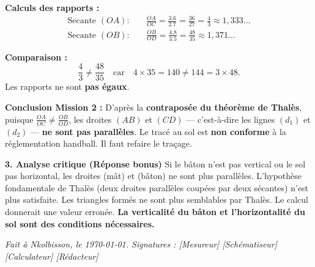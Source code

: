\documentclass[11pt]{article}
\begin{document}
\begin{exoresolu}
\noindent\textbf{Calculs des rapports :}
\begin{align*}
\text{Secante } (OA) : \quad & \frac{OA}{OC} = \frac{\num{3,6}}{\num{2,7}} = \frac{36}{27} = \frac{4}{3} \approx 1,333\ldots \\[4pt]
\text{Secante } (OB) : \quad & \frac{OB}{OD} = \frac{\num{4,8}}{\num{3,5}} = \frac{48}{35} \approx 1,371\ldots
\end{align*}

\noindent\textbf{Comparaison :}
\[
\frac{4}{3} \neq \frac{48}{35} \quad \text{car} \quad 4 \times 35 = 140 \neq 144 = 3 \times 48.
\]
Les rapports ne sont \textbf{pas égaux}.

\noindent\textbf{Conclusion Mission 2 :} D'après la \textbf{contraposée du théorème de Thalès}, puisque $\frac{OA}{OC} \neq \frac{OB}{OD}$, les droites $(AB)$ et $(CD)$ — c'est-à-dire les lignes $(d_1)$ et $(d_2)$ — \textbf{ne sont pas parallèles}.
Le tracé au sol est \textbf{non conforme} à la réglementation handball. Il faut refaire le traçage.

\vspace{0,3cm}
\noindent\textbf{3. Analyse critique (Réponse bonus)}
Si le bâton n'est pas vertical ou le sol pas horizontal, les droites (mât) et (bâton) ne sont plus parallèles. L'hypothèse fondamentale de Thalès (deux droites parallèles coupées par deux sécantes) n'est plus satisfaite. Les triangles formés ne sont plus semblables par Thalès. Le calcul donnerait une valeur erronée. \textbf{La verticalité du bâton et l'horizontalité du sol sont des conditions nécessaires.}

\vspace{0,3cm}
\noindent\textit{Fait à Nkolbisson, le \today. Signatures : [Mesureur] [Schématiseur] [Calculateur] [Rédacteur]}
\end{exoresolu}
\end{document}
